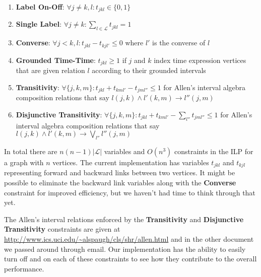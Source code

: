 \documentclass[11pt,letterpaper]{article}
\begin{document}
\begin{enumerate}

\item \textbf{Label On-Off}: $\forall j\neq k, l: t_{jkl}\in \{0,1\}$

\item \textbf{Single Label}: $\forall j\neq k: \sum_{l\in \mathcal{L}}t_{jkl}=1$

\item \textbf{Converse}: $\forall j<k,l: t_{jkl}-t_{kjl'}\leq 0$ where $l'$ is 
the converse of $l$

\item \textbf{Grounded Time-Time}: $t_{jkl}\geq 1$ if $j$ and $k$ index time 
expression vertices that are given relation $l$ according to their grounded 
intervals

\item \textbf{Transitivity}: $\forall \{j,k,m\}: t_{jkl}+t_{kml'}-t_{jml''}\leq 1$ for Allen's 
interval algebra composition relations that 
say $l(j,k)\wedge l'(k,m)\rightarrow l''(j,m)$

\item \textbf{Disjunctive Transitivity}: $\forall \{j,k,m\}: t_{jkl}+t_{kml'}-\sum_{l''}t_{jml''}\leq 1$ 
for Allen's interval algebra composition relations that say 
$l(j,k)\wedge l'(k,m)\rightarrow \bigvee_{l''}l''(j,m)$

\end{enumerate}

In total there are $n(n-1)|\mathcal{L}|$ variables and $O(n^3)$ 
constraints in the ILP for a graph with $n$ vertices.  The current 
implementation has variables $t_{jkl}$ and $t_{kjl}$ representing forward and 
backward links between two vertices.  It might be possible to eliminate the 
backward link variables along with the \textbf{Converse} constraint for 
improved efficiency, but we haven't had time to think through that yet. 

The Allen's interval relations enforced by the \textbf{Transitivity} and 
\textbf{Disjunctive Transitivity} constraints are given at 
\url{http://www.ics.uci.edu/~alspaugh/cls/shr/allen.html} and in the other 
document we passed around through email.  Our implementation has the ability 
to easily turn off and on each of these constraints to see how they 
contribute to the overall performance.
\end{document}
